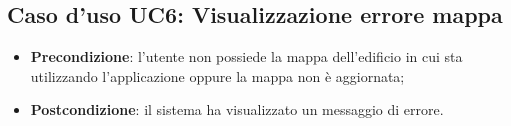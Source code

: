\documentclass[../AnalisiDeiRequisiti.tex]{subfiles}
\begin{document}
\subsection{Caso d'uso UC6: Visualizzazione errore mappa}
\begin{itemize} 
    \item \textbf{Precondizione}: l'utente non possiede la mappa dell'edificio in cui sta utilizzando l'applicazione oppure la mappa non è aggiornata;
    \item \textbf{Postcondizione}: il sistema ha visualizzato un messaggio di errore.
  \end{itemize}
 
\end{document}
